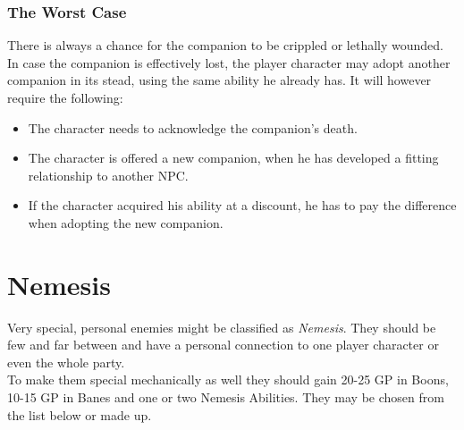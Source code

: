 \documentclass[12pt,a4paper,openany]{book}
\begin{document}
	\subsection{The Worst Case}
	There is always a chance for the companion to be crippled or lethally wounded. In case the companion is effectively lost, the player character may adopt another companion in its stead, using the same ability he already has. It will however require the following:
	\begin{itemize}
		\item The character needs to acknowledge the companion's death.
		\item The character is offered a new companion, when he has developed a fitting relationship to another NPC.
		\item If the character acquired his ability at a discount, he has to pay the difference when adopting the new companion.
	\end{itemize}
	

	\chapter{Nemesis}
	Very special, personal enemies might be classified as \emph{Nemesis}. They should be few and far between and have a personal connection to one player character or even the whole party.\\
	To make them special mechanically as well they should gain 20-25 GP in Boons, 10-15 GP in Banes and one or two Nemesis Abilities. They may be chosen from the list below or made up.
\end{document}
